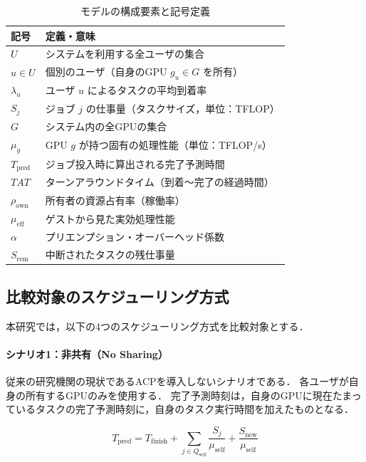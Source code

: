 \documentclass[12pt,a4paper]{jsarticle}
\begin{document}
\begin{table}[h]
  \centering
  \caption{モデルの構成要素と記号定義}
  \label{tab:notation}
  \begin{tabular}{ll}
    \toprule
    記号 & 定義・意味 \\
    \midrule
    $U$ & システムを利用する全ユーザの集合 \\
    $u \in U$ & 個別のユーザ（自身のGPU $g_u \in G$ を所有） \\
    $\lambda_u$ & ユーザ $u$ によるタスクの平均到着率 \\
    $S_j$ & ジョブ $j$ の仕事量（タスクサイズ，単位：TFLOP） \\
    $G$ & システム内の全GPUの集合 \\
    $\mu_g$ & GPU $g$ が持つ固有の処理性能（単位：TFLOP/s） \\
    $T_\mathrm{pred}$ & ジョブ投入時に算出される完了予測時間 \\
    $TAT$ & ターンアラウンドタイム（到着〜完了の経過時間） \\
    $\rho_\mathrm{own}$ & 所有者の資源占有率（稼働率） \\
    $\mu_\mathrm{eff}$ & ゲストから見た実効処理性能 \\
    $\alpha$ & プリエンプション・オーバーヘッド係数 \\
    $S_\mathrm{rem}$ & 中断されたタスクの残仕事量 \\
    \bottomrule
  \end{tabular}
\end{table}

\subsection{比較対象のスケジューリング方式}

本研究では，以下の4つのスケジューリング方式を比較対象とする．

\paragraph{シナリオ1：非共有（No Sharing）}
従来の研究機関の現状であるACPを導入しないシナリオである．
各ユーザが自身の所有するGPUのみを使用する．
完了予測時刻は，自身のGPUに現在たまっているタスクの完了予測時刻に，自身のタスク実行時間を加えたものとなる．

\begin{equation}
  T_\mathrm{pred} = T_\mathrm{finish} + \sum_{j \in Q_\mathrm{self}} \frac{S_j}{\mu_\mathrm{self}} + \frac{S_\mathrm{new}}{\mu_\mathrm{self}}
  \label{eq:no_sharing}
\end{equation}
\end{document}
